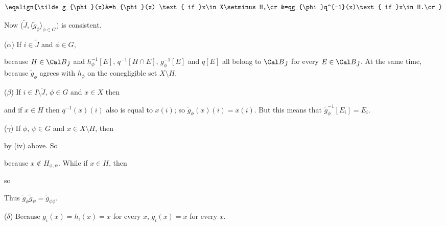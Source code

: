 {$$\eqalign{\tilde g_{\phi}(x)&=h_{\phi}(x)
  \text{ if }x\in X\setminus H,\cr
&=qg_{\phi}q^{-1}(x)\text{ if }x\in H.\cr}$$

\noindent Now ($\tilde J,\langle \tilde g_{\phi}\rangle_{\phi\in G})$ is
consistent.   \Prf\

\qquad($\alpha$) If $i\in\tilde J$ and $\phi\in G$,


\noindent because $H\in\Cal B_{\tilde J}$ and
$h_{\phi}^{-1}[E]$, $q^{-1}[H\cap E]$, $g_{\phi}^{-1}[E]$ and $q[E]$ all
belong to $\Cal B_{\tilde J}$ for every $E\in\Cal B_{\tilde J}$.   At
the same time, because $\tilde g_{\phi}$ agrees with $h_{\phi}$ on the
conegligible set $X\setminus H$,


\qquad($\beta$) If $i\in I\setminus\tilde J$, $\phi\in G$ and $x\in X$ then


\noindent and if $x\in H$ then $q^{-1}(x)(i)$ also is equal to $x(i)$;
so $\tilde g_{\phi}(x)(i)=x(i)$.   But this means that 
$\tilde g_{\phi}^{-1}[E_i]=E_i$.

\qquad($\gamma$) If $\phi$, $\psi\in G$ and $x\in X\setminus H$, then


\noindent by (iv) above.   So


\noindent because $x\notin H_{\phi,\psi}$.   While if $x\in H$, then


\noindent so


\noindent Thus $\tilde g_{\phi}\tilde g_{\psi}=\tilde g_{\psi\phi}$.

\qquad($\delta$) Because $g_{\iota}(x)=h_{\iota}(x)=x$ for every $x$,
$\tilde g_{\iota}(x)=x$ for every $x$.\ \Qed

}

